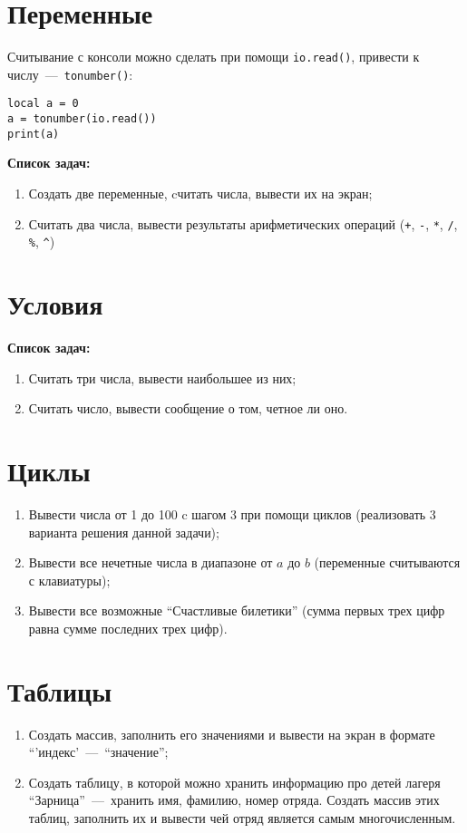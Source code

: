 \lstset{style=Lua}


\section*{Переменные}

Считывание с консоли можно сделать при помощи \lstinline{io.read()}, привести к числу~---~\lstinline{tonumber()}:

\begin{lstlisting}
local a = 0
a = tonumber(io.read())
print(a)
\end{lstlisting}

\textbf{Список задач:}

\begin{enumerate}
	\item Создать две переменные, cчитать числа, вывести их на экран;
	\item Считать два числа, вывести результаты арифметических операций (\lstinline{+}, \lstinline{-}, \lstinline{*}, \lstinline{/}, \lstinline{%}, \lstinline{^})
\end{enumerate}

\section*{Условия}

\textbf{Список задач:}

\begin{enumerate}
	\item Считать три числа, вывести наибольшее из них;
	\item Считать число, вывести сообщение о том, четное ли оно.
\end{enumerate}

\section*{Циклы}

\begin{enumerate}
	\item Вывести числа от 1 до 100 c шагом 3 при помощи циклов (реализовать 3 варианта решения данной задачи);
	\item Вывести все нечетные числа в диапазоне от $a$ до $b$ (переменные считываются с клавиатуры);
	\item Вывести все возможные ``Счастливые билетики'' (сумма первых трех цифр равна сумме последних трех цифр).
\end{enumerate}

\section*{Таблицы}

\begin{enumerate}
	\item Создать массив, заполнить его значениями и вывести на экран в формате ``'индекс'~---~``значение'';
	\item Создать таблицу, в которой можно хранить информацию про детей лагеря ``Зарница''~---~хранить имя, фамилию, номер отряда. Создать массив этих таблиц, заполнить их и вывести чей отряд является самым многочисленным.
\end{enumerate}